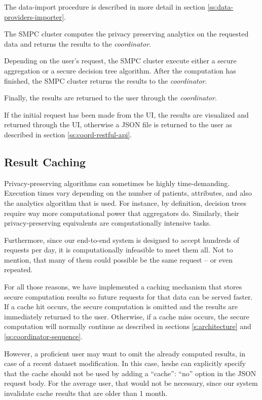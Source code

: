 \begin{description}[labelwidth=4em, leftmargin=\dimexpr\labelwidth+\labelsep\relax]
  The data\hyp import procedure is described in more detail in section \ref{ss:data-providers-importer}.


  \item [Step 4:] The SMPC cluster computes the privacy preserving analytics on the requested data and returns the results to the \textit{coordinator}.

  Depending on the user's request, the SMPC cluster execute either a secure aggregation or a secure decision tree algorithm.
  After the computation has finished, the SMPC cluster returns the results to the \textit{coordinator}.


  \item [Step 5:] Finally, the results are returned to the user through the \textit{coordinator}.

  If the initial request has been made from the UI, the results are visualized and returned through the UI, otherwise a JSON file is returned to the user as described in section \ref{ss:coord-restful-api}.

\end{description}



\subsection{Result Caching}\label{ss:caching}
Privacy-preserving algorithms can sometimes be highly time-demanding.
Execution times vary depending on the number of patients, attributes, and also the analytics algorithm that is used.
For instance, by definition, decision trees require way more computational power that aggregators do.
Similarly, their privacy\hyp preserving equivalents are computationally intensive tasks.

Furthermore, since our end-to-end system is designed to accept hundreds of requests per day, it is computationally infeasible to meet them all.
Not to mention, that many of them could possible be the same request -- or even repeated.

For all those reasons, we have implemented a caching mechanism that stores secure computation results so future requests for that data can be served faster.
If a cache hit occurs, the secure computation is omitted and the results are immediately returned to the user.
Otherwise, if a cache miss occurs, the secure computation will normally continue as described in sections \ref{s:architecture} and \ref{ss:coordinator-sequence}.

However, a proficient user may want to omit the already computed results, in case of a recent dataset modification.
In this case, he\myslash she can explicitly specify that the cache should not be used by adding a ``cache'': ``no'' option in the JSON request body.
For the average user, that would not be necessary, since our system invalidate cache results that are older than 1 month.





